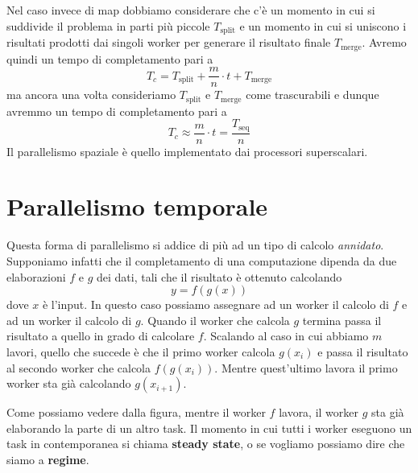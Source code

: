 Nel caso invece di map dobbiamo considerare che c'è un momento in cui si suddivide il problema in
parti più piccole $T_\text{split}$ e un momento in cui si uniscono i risultati prodotti dai singoli
worker per generare il risultato finale $T_\text{merge}$. Avremo quindi un tempo di completamento
pari a
\[ T_c = T_\text{split} + \frac{m}{n} \cdot t + T_\text{merge} \]
ma ancora una volta consideriamo $T_\text{split}$ e $T_\text{merge}$ come trascurabili e dunque
avremmo un tempo di completamento pari a
\[ T_c \approx \frac{m}{n} \cdot t = \frac{T_\text{seq}}{n} \]
Il parallelismo spaziale è quello implementato dai processori superscalari.

\section{Parallelismo temporale}
Questa forma di parallelismo si addice di più ad un tipo di calcolo \emph{annidato}. Supponiamo
infatti che il completamento di una computazione dipenda da due elaborazioni $f$ e $g$ dei dati,
tali che il risultato è ottenuto calcolando
\[ y = f(g(x)) \]
dove $x$ è l'input. In questo caso possiamo assegnare ad un worker il calcolo di $f$ e ad un worker
il calcolo di $g$. Quando il worker che calcola $g$ termina passa il risultato a quello in grado di
calcolare $f$. Scalando al caso in cui abbiamo $m$ lavori, quello che succede è che il primo worker
calcola $g(x_i)$ e passa il risultato al secondo worker che calcola $f(g(x_i))$. Mentre quest'ultimo
lavora il primo worker sta già calcolando $g(x_{i+1})$.
\begin{center}
\end{center}
Come possiamo vedere dalla figura, mentre il worker $f$ lavora, il worker $g$ sta già elaborando
la parte di un altro task. Il momento in cui tutti i worker eseguono un task in contemporanea si
chiama \textbf{steady state}, o se vogliamo possiamo dire che siamo a \textbf{regime}.

